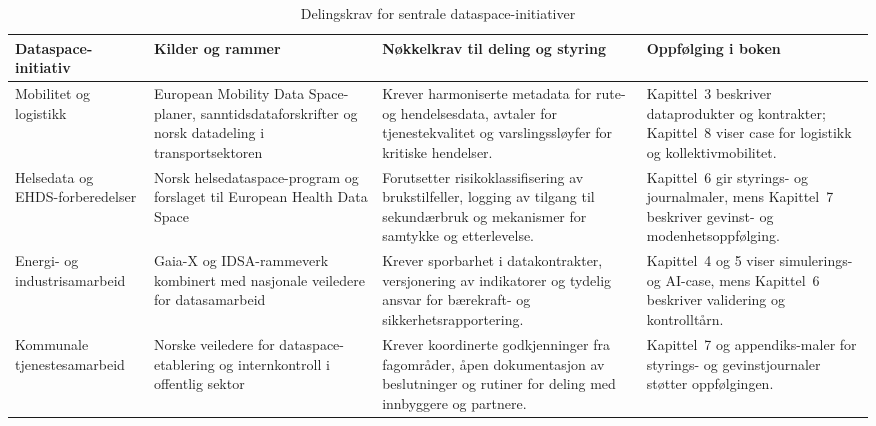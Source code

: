 \begin{table}[htbp]
    \centering
    \caption{Delingskrav for sentrale dataspace-initiativer}
    \label{tab:appendiks-dataspace-regler}
    \begin{tabular}{p{3.2cm}p{5.0cm}p{5.2cm}p{3.4cm}}
        \toprule
        \textbf{Dataspace-initiativ} & \textbf{Kilder og rammer} & \textbf{Nøkkelkrav til deling og styring} & \textbf{Oppfølging i boken} \\
        \midrule
        Mobilitet og logistikk & European Mobility Data Space-planer, sanntidsdataforskrifter og norsk datadeling i transportsektoren\citep{ec2023mobilitydataspace,ec2023mobilitydataspaceblueprint,digdir2024sanntidsdata} & Krever harmoniserte metadata for rute- og hendelsesdata, avtaler for tjenestekvalitet og varslingssløyfer for kritiske hendelser. & Kapittel~3 beskriver dataprodukter og kontrakter; Kapittel~8 viser case for logistikk og kollektivmobilitet. \\
        \addlinespace
        Helsedata og EHDS-forberedelser & Norsk helsedataspace-program og forslaget til European Health Data Space\citep{nhn2024dataspace,eu2022ehdsproposal} & Forutsetter risikoklassifisering av brukstilfeller, logging av tilgang til sekundærbruk og mekanismer for samtykke og etterlevelse. & Kapittel~6 gir styrings- og journalmaler, mens Kapittel~7 beskriver gevinst- og modenhetsoppfølging. \\
        \addlinespace
        Energi- og industrisamarbeid & Gaia-X og IDSA-rammeverk kombinert med nasjonale veiledere for datasamarbeid\citep{gaiax2023architecture,idsa2023operational,digdir2024datasamarbeid,dssc2024dataproducts} & Krever sporbarhet i datakontrakter, versjonering av indikatorer og tydelig ansvar for bærekraft- og sikkerhetsrapportering. & Kapittel~4 og \nobreakspace{}5 viser simulerings- og AI-case, mens Kapittel~6 beskriver validering og kontrolltårn. \\
        \addlinespace
        Kommunale tjenestesamarbeid & Norske veiledere for dataspace-etablering og internkontroll i offentlig sektor\citep{digitalnorway2024dataspace,dfo2024internkontroll} & Krever koordinerte godkjenninger fra fagområder, åpen dokumentasjon av beslutninger og rutiner for deling med innbyggere og partnere. & Kapittel~7 og appendiks-maler for styrings- og gevinstjournaler støtter oppfølgingen. \\
        \bottomrule
    \end{tabular}
\end{table}

